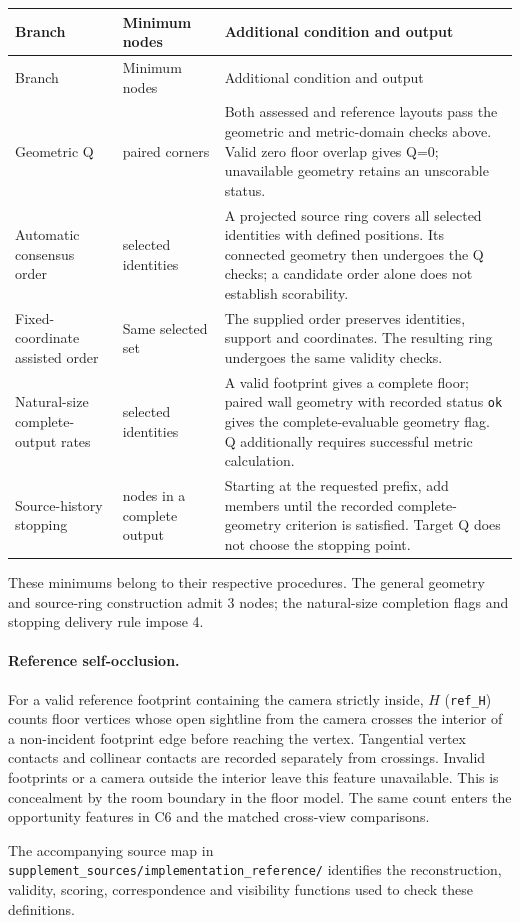 \begingroup\small
\begin{longtable}{@{}>{\raggedright\arraybackslash}p{.24\linewidth}>{\raggedright\arraybackslash}p{.14\linewidth}>{\raggedright\arraybackslash}p{.56\linewidth}@{}}
\toprule
Branch & Minimum nodes & Additional condition and output\\
\midrule\endfirsthead
\toprule Branch & Minimum nodes & Additional condition and output\\\midrule\endhead
Geometric Q & 3 paired corners & Both assessed and reference layouts pass the geometric and metric-domain checks above. Valid zero floor overlap gives Q=0; unavailable geometry retains an unscorable status.\\[3pt]
Automatic consensus order & 3 selected identities & A projected source ring covers all selected identities with defined positions. Its connected geometry then undergoes the Q checks; a candidate order alone does not establish scorability.\\[3pt]
Fixed-coordinate assisted order & Same selected set & The supplied order preserves identities, support and coordinates. The resulting ring undergoes the same validity checks.\\[3pt]
Natural-size complete-output rates & 4 selected identities & A valid footprint gives a complete floor; paired wall geometry with recorded status \texttt{ok} gives the complete-evaluable geometry flag. Q additionally requires successful metric calculation.\\[3pt]
Source-history stopping & 4 nodes in a complete output & Starting at the requested prefix, add members until the recorded complete-geometry criterion is satisfied. Target Q does not choose the stopping point.\\
\bottomrule
\end{longtable}
\endgroup

These minimums belong to their respective procedures. The general geometry
and source-ring construction admit 3 nodes; the natural-size completion
flags and stopping delivery rule impose 4.

\paragraph{Reference self-occlusion.}
For a valid reference footprint containing the camera strictly inside,
$H$ (\texttt{ref\_H}) counts floor vertices whose open sightline from the
camera crosses the interior of a non-incident footprint edge before reaching
the vertex. Tangential vertex contacts and collinear contacts are recorded
separately from crossings. Invalid footprints or a camera outside the
interior leave this feature unavailable. This is concealment by the room
boundary in the floor model. The same count enters the opportunity features
in C6 and the matched cross-view comparisons.

The accompanying source map in
\texttt{supplement\_sources/implementation\_reference/} identifies the
reconstruction, validity, scoring, correspondence and visibility functions
used to check these definitions.
